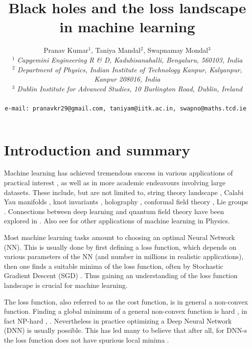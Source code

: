 \documentclass[12pt,a4paper]{JHEP3}
\title{Black holes and the loss landscape in machine learning}
\author{Pranav Kumar$^1$, Taniya Mandal$^2$, Swapnamay Mondal$^3$ 
\\
$^1$ {\it Capgemini Engineering R \& D, Kadubisanahalli, Bengaluru, 560103, India} \\
$^2$ {\it Department of Physics, Indian Institute of Technology Kanpur, Kalyanpur, Kanpur 208016, India}
\\
$^3$ {\it Dublin Institute for Advanced Studies, 10 Burlington Road, Dublin, Ireland}
\\
\vspace*{2mm}\\
{\tt e-mail: pranavkr29@gmail.com, taniyam@iitk.ac.in, swapno@maths.tcd.ie }
\vspace*{-3mm}
}
\begin{document}
 
\maketitle

\pagebreak
\section{Introduction and summary}
Machine learning has achieved tremendous success in various applications of practical interest \cite{NIPS2012_c399862d, 5740583, Manning}, as well as in more academic endeavours involving large datasets. These include, but are not limited to, string theory landscape \cite{He:2017aed,He:2017set,Ruehle:2017mzq,Carifio:2017bov,Mutter:2018sra,He:2021eiu}, 
Calabi Yau manifolds \cite{Bull:2018uow, Bull:2019cij,Jejjala:2020wcc,Berglund:2022gvm,Erbin:2020srm,Erbin:2020tks,He:2020lbz,Anderson:2020hux,Berman:2021mcw,Erbin:2021hmx},
knot invariants \cite{Craven:2020bdz,Craven:2021ckk,Craven:2022cxe, Gukov:2020qaj}, 
holography \cite{Hashimoto:2018ftp,Hashimoto:2018bnb,Tan:2019czc,Akutagawa:2020yeo, Yan:2020wcd}, conformal field theory \cite{Chen:2020dxg, Basu:2022qaf, Kuo:2021lvu, Kantor:2021kbx,Kantor:2021jpz,Kantor:2022epi}, Lie groups \cite{Chen:2020jjw,Lal:2022otf}. Connections between deep learning and quantum field theory have been explored in \cite{Koch:2019fxy,Halverson:2020trp,Maiti:2021fpy,Halverson:2021aot, Erbin:2021kqf,Grosvenor:2021eol,Erbin:2022lls,Banta:2023kqe}.
 Also see \cite{CaboBizet:2020cse,Hashimoto:2019bih,Betzler:2020rfg,Krippendorf:2020gny,Bao:2020nbi,Ruehle:2020jrk,He:2023csq, bedolla2020machine,samarakoon2021machine,carrasquilla2017machine,decelle2022introduction,RevModPhys.91.045002} for other applications of machine learning in Physics.  

Most machine learning tasks amount to choosing an optimal Neural Network (NN). This  is usually done by first defining a loss function, which depends on various parameters of the NN (and number in millions in realistic applications), then one finds a suitable minima of the loss function, often by Stochastic Gradient Descent (SGD) \cite{EonBottou1998OnlineLA}. 
Thus gaining an understanding of the loss function landscape is crucial for machine learning.


The loss function, also referred to as the cost function,  is in general a non-convex function. Finding a global minimum of a general non-convex function is hard \cite{10.1162/089976602760408035, livni2014computational, shalevshwartz2017failures}, in fact NP-hard \cite{Murty1987SomeNP}, \cite{10.5555/2969735.2969792}.
Nevertheless in practice optimizing a Deep Neural Network (DNN) is usually possible. This has led many to believe that after all, for DNN-s the loss function does not have spurious local minima \cite{freeman2017topology, hoffer2018train, soudry2016bad}.
\end{document}
